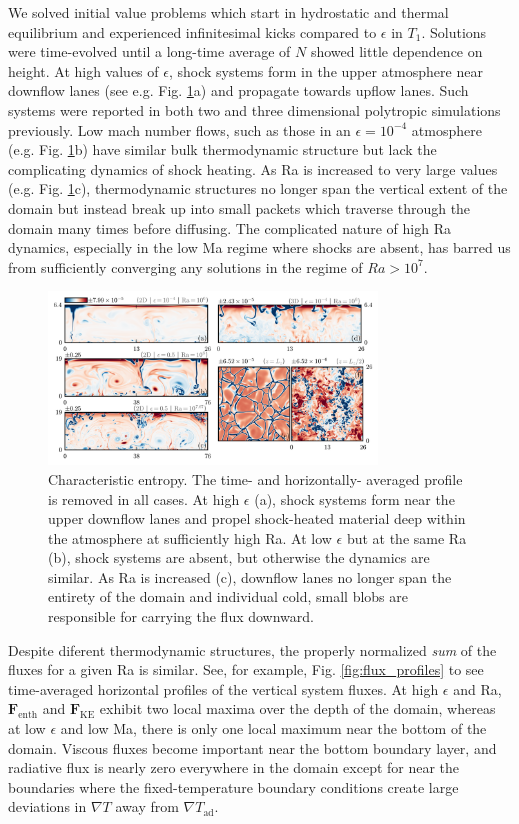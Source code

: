 \documentclass[aps, prl, twocolumn, groupedaddress, amsfonts, amssymb, amsmath]{revtex4-1}
\newcommand{\grad}{\ensuremath{\nabla}}
\begin{document}
We solved initial value problems which start in hydrostatic and thermal equilibrium and experienced infinitesimal 
kicks compared to $\epsilon$ in $T_1$.  Solutions were time-evolved until a long-time average of $N$ showed little
dependence on height. At
high values of $\epsilon$, shock systems form in the upper atmosphere near downflow lanes 
(see e.g. Fig. \ref{fig:entropy_snapshots}a) and propagate towards upflow lanes.  Such systems were reported in
both two \cite{cattaneo&all1990} and three \cite{malagoli&all1990} dimensional polytropic simulations previously.
Low mach number flows, such as those in an $\epsilon = 10^{-4}$ atmosphere (e.g. Fig. \ref{fig:entropy_snapshots}b)
have similar bulk thermodynamic structure but lack the complicating dynamics of shock heating. As Ra is
increased to very large values (e.g. Fig. \ref{fig:entropy_snapshots}c), thermodynamic structures no longer span
the vertical extent of the domain but instead break up into small packets which traverse through the domain many
times before diffusing.  The complicated nature of high Ra dynamics, especially in the low Ma regime where
shocks are absent, has barred us from sufficiently converging any solutions in the regime of $Ra > 10^7$.

\begin{figure}[t]
\includegraphics[width=3.4375in]{./figs/snapshots_fig.png}
\caption{Characteristic entropy. The time- and horizontally-
averaged profile is removed in all cases.  At high
$\epsilon$ (a), shock systems form near the upper downflow lanes and propel shock-heated material deep within
the atmosphere at sufficiently high Ra.  At low $\epsilon$ but at the same Ra (b), shock systems are absent, 
but otherwise the dynamics are similar.  As Ra is increased (c), downflow lanes no longer span
the entirety of the domain and individual cold, small blobs are responsible for carrying the flux downward.
\label{fig:entropy_snapshots} }
\end{figure}


Despite diferent thermodynamic structures, the properly normalized \emph{sum} of the fluxes for a given
Ra is similar.  See, for example, Fig. \ref{fig:flux_profiles} to see time-averaged horizontal profiles of
the vertical system fluxes.  At high $\epsilon$ and Ra, $\bm{F}_{\text{enth}}$ and $\bm{F}_{\text{KE}}$
exhibit two local maxima over the depth of the domain, whereas at low $\epsilon$ and low Ma, there is only
one local maximum near the bottom of the domain.  Viscous fluxes become important near the bottom boundary
layer, and radiative flux is nearly zero everywhere in the domain except for near the boundaries where the
fixed-temperature boundary conditions create large deviations in $\grad T$ away from $\grad T_{\text{ad}}$.
\end{document}
